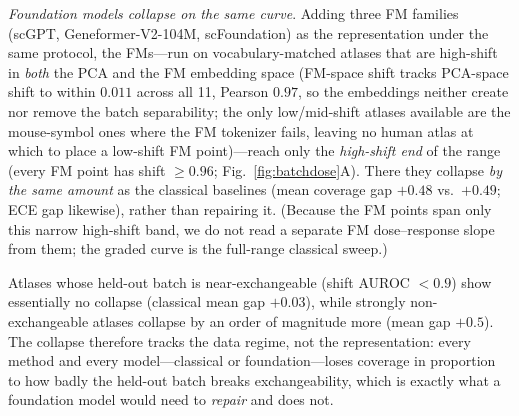 \documentclass[fleqn,10pt,lineno]{wlpeerj}  %
\begin{document}
\emph{Foundation models collapse on the same curve}. Adding three FM families (scGPT, Geneformer-V2-104M, scFoundation) as the representation under the same protocol, the FMs---run on vocabulary-matched atlases that are high-shift in \emph{both} the PCA and the FM embedding space (FM-space shift tracks PCA-space shift to within $0.011$ across all 11, Pearson $0.97$, so the embeddings neither create nor remove the batch separability; the only low/mid-shift atlases available are the mouse-symbol ones where the FM tokenizer fails, leaving no human atlas at which to place a low-shift FM point)---reach only the \emph{high-shift end} of the range (every FM point has shift $\ge 0.96$; Fig.~\ref{fig:batchdose}A). There they collapse \emph{by the same amount} as the classical baselines (mean coverage gap $+0.48$ vs.\ $+0.49$; ECE gap likewise), rather than repairing it. (Because the FM points span only this narrow high-shift band, we do not read a separate FM dose--response slope from them; the graded curve is the full-range classical sweep.)

Atlases whose held-out batch is near-exchangeable (shift AUROC $<0.9$) show essentially no collapse (classical mean gap $+0.03$), while strongly non-exchangeable atlases collapse by an order of magnitude more (mean gap $+0.5$). The collapse therefore tracks the data regime, not the representation: every method and every model---classical or foundation---loses coverage in proportion to how badly the held-out batch breaks exchangeability, which is exactly what a foundation model would need to \emph{repair} and does not.
\end{document}
